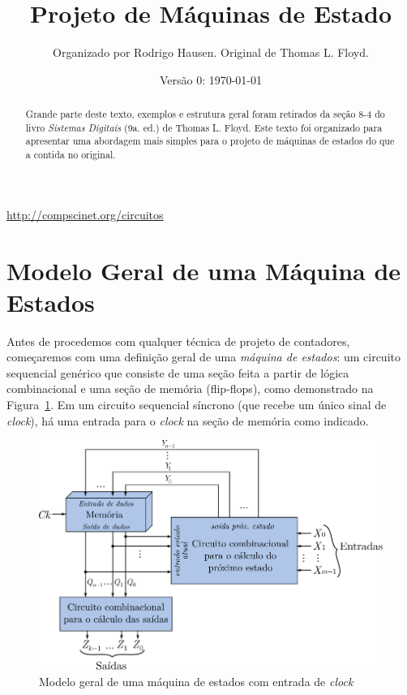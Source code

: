 \documentclass[a4paper]{article}
\title{Projeto de Máquinas de Estado}
\author{Organizado por Rodrigo Hausen. Original de Thomas L. Floyd.}
\date{Versão 0: \today}
\begin{document}
\maketitle

\vspace{-1cm}

\begin{center}
\url{http://compscinet.org/circuitos}
\end{center}

\begin{abstract}
Grande parte deste texto, exemplos e estrutura geral foram retirados
da seção 8-4 do livro \emph{Sistemas Digitais} (9a. ed.) de Thomas L. Floyd.
Este texto foi organizado para apresentar uma abordagem mais simples
para o projeto de máquinas de estados do que a contida no original.
\end{abstract}

\section{Modelo Geral de uma Máquina de Estados}

Antes de procedemos com qualquer técnica de projeto de contadores,
começaremos com uma definição geral de uma \emph{máquina de estados}:
um circuito sequencial genérico que consiste de uma seção feita a
partir de lógica combinacional e uma seção de memória (flip-flops),
como demonstrado na Figura~\ref{fig:modelo_geral}. Em um circuito
sequencial síncrono (que recebe um único sinal de \emph{clock}), há
uma entrada para o \emph{clock} na seção de memória como indicado.

\begin{figure}[!htp]
\begin{center}
\includegraphics{images/state_machine_general}
\caption{Modelo geral de uma máquina de estados com entrada de \emph{clock}}
\label{fig:modelo_geral}
\end{center}
\end{figure}
\end{document}
